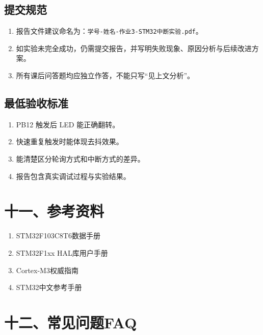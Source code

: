 \documentclass[
  chinese,
  UTF8,
  oneside,
  openany]{ctexbook}
\providecommand{\tightlist}{%
  \setlength{\itemsep}{0pt}\setlength{\parskip}{0pt}}
\begin{document}
\subsection{提交规范}\label{ux63d0ux4ea4ux89c4ux8303-2}

\begin{enumerate}
\def\labelenumi{\arabic{enumi}.}
\tightlist
\item
  报告文件建议命名为：\texttt{学号-姓名-作业3-STM32中断实验.pdf}。
\item
  如实验未完全成功，仍需提交报告，并写明失败现象、原因分析与后续改进方案。
\item
  所有课后问答题均应独立作答，不能只写``见上文分析''。
\end{enumerate}

\subsection{最低验收标准}\label{ux6700ux4f4eux9a8cux6536ux6807ux51c6-2}

\begin{enumerate}
\def\labelenumi{\arabic{enumi}.}
\tightlist
\item
  PB12 触发后 LED 能正确翻转。
\item
  快速重复触发时能体现去抖效果。
\item
  能清楚区分轮询方式和中断方式的差异。
\item
  报告包含真实调试过程与实验结果。
\end{enumerate}

\section{十一、参考资料}\label{ux5341ux4e00ux53c2ux8003ux8d44ux6599}

\begin{enumerate}
\def\labelenumi{\arabic{enumi}.}
\tightlist
\item
  STM32F103C8T6数据手册
\item
  STM32F1xx HAL库用户手册
\item
  Cortex-M3权威指南
\item
  STM32中文参考手册
\end{enumerate}

\section{十二、常见问题FAQ}\label{ux5341ux4e8cux5e38ux89c1ux95eeux9898faq}
\end{document}

